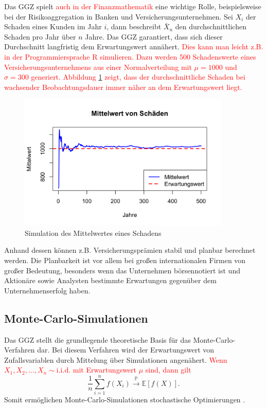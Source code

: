 \documentclass[aodsor,preprint]{imsart}
\numberwithin{equation}{section}
\theoremstyle{plain}
\begin{document}
Das GGZ spielt \textcolor{red}{auch in der Finanzmathematik} eine wichtige Rolle, beispielsweise bei der Risikoaggregation in Banken und Versicherungsunternehmen. Sei \( X_i \) der Schaden eines Kunden im Jahr \( i \), dann beschreibt \( \bar{X}_n \) den durchschnittlichen Schaden pro Jahr über \( n \) Jahre. Das GGZ garantiert, dass sich dieser Durchschnitt langfristig dem Erwartungswert annähert.
\textcolor{red}{
Dies kann man leicht z.B. in der Programmiersprache R simulieren.
Dazu werden 500 Schadenswerte eines Versicherungsunternehmens aus einer Normalverteilung mit \( \mu = 1000 \) und \( \sigma = 300 \) generiert.
Abbildung \ref{fig:schaden} zeigt, dass der durchschnittliche Schaden bei wachsender Beobachtungsdauer immer näher an dem Erwartungswert liegt.
}

\begin{figure}[h!]
  \centering
  \includegraphics[width=0.9\textwidth]{schaden.png}
  \caption{Simulation des Mittelwertes eines Schadens}
  \label{fig:schaden}
\end{figure}

Anhand dessen können z.B. Versicherungsprämien stabil und planbar berechnet werden. Die Planbarkeit ist vor allem bei großen internationalen Firmen von großer Bedeutung, besonders wenn das Unternehmen börsennotiert ist und Aktionäre sowie Analysten bestimmte Erwartungen gegenüber dem Unternehmenserfolg haben.


\subsection{Monte-Carlo-Simulationen}

Das GGZ stellt die grundlegende theoretische Basis für das Monte-Carlo-Verfahren dar.
Bei diesem Verfahren wird der Erwartungswert von Zufallsvariablen durch Mittelung über Simulationen angenähert.
\textcolor{red}{Wenn \( X_1, X_2, \dots, X_n \sim \text{i.i.d.} \) mit Erwartungswert \( \mu \) sind, dann gilt}
\[
\frac{1}{n} \sum_{i=1}^n f(X_i) \xrightarrow{\mathbb{P}} \mathbb{E}[f(X)].
\]
Somit ermöglichen Monte-Carlo-Simulationen stochastische Optimierungen  \citep{degroot2021}.
\end{document}
